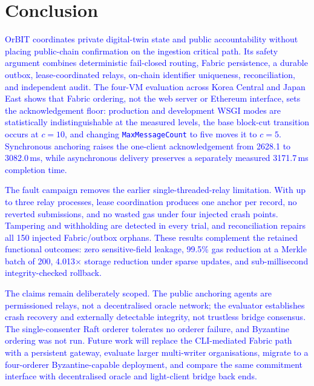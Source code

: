 \documentclass[final,5p,times,twocolumn]{elsarticle}
\begin{document}
\fi
\section{\textbf{Conclusion}}
\label{sec:conclusion}

\textcolor{blue}{OrBIT coordinates private digital-twin state and public accountability without placing public-chain confirmation on the ingestion critical path. Its safety argument combines deterministic fail-closed routing, Fabric persistence, a durable outbox, lease-coordinated relays, on-chain identifier uniqueness, reconciliation, and independent audit. The four-VM evaluation across Korea Central and Japan East shows that Fabric ordering, not the web server or Ethereum interface, sets the acknowledgement floor: production and development WSGI modes are statistically indistinguishable at the measured levels, the base block-cut transition occurs at $c=10$, and changing \texttt{MaxMessageCount} to five moves it to $c=5$. Synchronous anchoring raises the one-client acknowledgement from 2628.1 to 3082.0\,ms, while asynchronous delivery preserves a separately measured 3171.7\,ms completion time.}

\textcolor{blue}{The fault campaign removes the earlier single-threaded-relay limitation. With up to three relay processes, lease coordination produces one anchor per record, no reverted submissions, and no wasted gas under four injected crash points. Tampering and withholding are detected in every trial, and reconciliation repairs all 150 injected Fabric/outbox orphans. These results complement the retained functional outcomes: zero sensitive-field leakage, 99.5\% gas reduction at a Merkle batch of 200, 4.013$\times$ storage reduction under sparse updates, and sub-millisecond integrity-checked rollback.}

\textcolor{blue}{The claims remain deliberately scoped. The public anchoring agents are permissioned relays, not a decentralised oracle network; the evaluator establishes crash recovery and externally detectable integrity, not trustless bridge consensus. The single-consenter Raft orderer tolerates no orderer failure, and Byzantine ordering was not run. Future work will replace the CLI-mediated Fabric path with a persistent gateway, evaluate larger multi-writer organisations, migrate to a four-orderer Byzantine-capable deployment, and compare the same commitment interface with decentralised oracle and light-client bridge back ends.}

\iffalse
\end{document}
